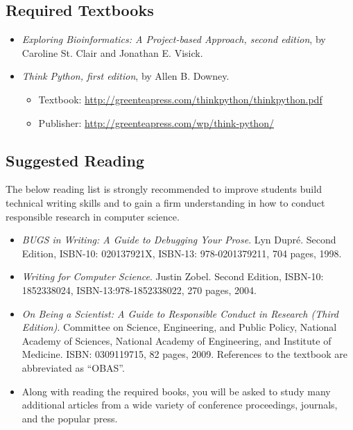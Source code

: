 \documentclass[11pt]{article} %
\begin{document}
\subsection*{\textbf{Required Textbooks}}
\begin{itemize}

\item \emph{Exploring Bioinformatics: A Project-based Approach, second edition}, by Caroline St. Clair and
Jonathan E. Visick.

\item \emph{Think Python, first edition}, by Allen B. Downey.
	\begin{itemize}
		\item Textbook: \url{http://greenteapress.com/thinkpython/thinkpython.pdf}
		\item Publisher: \url{http://greenteapress.com/wp/think-python/}
	\end{itemize}
\end{itemize}



\subsection*{\textbf{Suggested Reading}}

The below reading list is strongly recommended to improve students build technical writing skills and to gain a firm understanding in how to conduct responsible research in computer science.


\begin{itemize}

\item {\em BUGS in Writing: A Guide to Debugging Your Prose}. Lyn Dupr\'e. Second Edition,  ISBN-10: 020137921X, ISBN-13: 978-0201379211, 704 pages, 1998.

\item {\em Writing for Computer Science}.  Justin Zobel. Second Edition,  ISBN-10: 1852338024, ISBN-13:978-1852338022, 270 pages, 2004.

\item  \emph{On Being a Scientist: A Guide to Responsible Conduct in Research (Third Edition)}. Committee on Science, Engineering, and Public Policy, National Academy of Sciences, National Academy of Engineering, and Institute of Medicine. ISBN: 0309119715, 82 pages, 2009. References to the textbook are abbreviated as ``OBAS''.

\item Along with reading the required books, you will be asked to study many additional articles from a wide variety of conference proceedings, journals, and the popular press.
\end{itemize}
\end{document}
